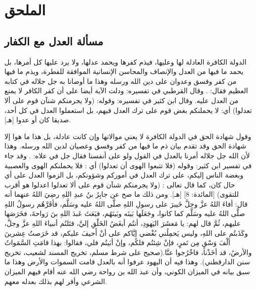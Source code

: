 \chapter{الملحق}
\label{sec:appendix}

\section{مسألة العدل مع الكفار}
\label{sec:app_justice}

الدولة الكافرة العادلة لها وعليها، فيذم كفرها ويحمد عدلها، ولا يرد عليها كل أمرها، بل يحمد ما فيها من العدل والإنصاف والمحاسن الإنسانية الموافقة للفطرة، ويذم ما فيها من كفر وفسق وعدوان على دين الله ورسله وهذا ما أوصانا به جل جلاله في كتابه العظيم فقال: 
\quranayah*[5][8]{\footnotesize \surahname*[5]}. وقال القرطبي في تفسيره: ودلت الآية أيضا على أن كفر الكافر لا يمنع من العدل عليه. وقال ابن كثير في تفسيره: وقوله: (ولا يجرمنكم شنآن قوم على ألا تعدلوا) أي: لا يحملنكم بغض قوم على ترك العدل فيهم، بل استعملوا العدل في كل أحد، صديقا كان أو عدوا [هـ]. 


وقول شهادة الحق في الدولة الكافرة لا يعني موالاتها وإن كانت عادلة، بل هذا ما هوا إلا شهادة الحق وقد تقدم بيان ذم ما فيها من كفر وفسق وعصيان لدين الله ورسله. وهذا لأن الله جل جلاله أمرنا بالعدل في القول ولو على أنفسنا فقال جل في علاه:
\quranayah*[4][135]{\footnotesize \surahname*[4]}. وقد جاء في تفسير ابن كثير: وقوله (فلا تتبعوا الهوى أن تعدلوا) أي : فلا يحملنكم الهوى والعصبية وبغضة الناس إليكم، على ترك العدل في أموركم وشؤونكم، بل الزموا العدل على أي حال كان، كما قال تعالى : (ولا يجرمنكم شنآن قوم على ألا تعدلوا اعدلوا هو أقرب للتقوى) [المائدة: 8] [هـ]. ومن ذلك ما صح عن جابِرُ بنُ عبدِ اللهِ رضِيَ اللهُ عنهما أنه قال: أفاءَ اللهُ عزَّ وجلَّ خَيبرَ على رسولِ اللهِ صلَّى اللهُ عليه وسَلَّم، فأقَرَّهُم رسولُ اللهِ صلَّى اللهُ عليه وسَلَّم كما كانوا، وجَعَلَها بَينَه وبَينَهُم، فبَعَثَ عَبدَ اللهِ بنَ رَواحةَ، فخَرَصَها عليهم، ثُمَّ قال لهم: يا مَعشَرَ اليَهودِ، أنتُم أبغَضُ الخَلْقِ إليَّ، قتَلتُم أنبياءَ اللهِ عزَّ وجلَّ، وكَذَبتُم على اللهِ، وليس يَحمِلُني بُغْضي إيَّاكم على أنْ أَحيفَ عليكم، قد خَرَصتُ عِشرينَ ألْفَ وَسْقٍ مِن تَمرٍ، فإنْ شِئتُم فلكُم، وإنْ أبَيتُم فلي، فقالوا: بهذا قامَتِ السَّمَواتُ والأرضُ، قد أخَذْنا، فاخْرُجوا عنَّا.{\footnotesize (صحيح على شرط مسلم، تخريج المسند لشعيب، تخريج سنن الدارقطني)}. وهذا فيه أن اليهود عرفوا أنه بالعدل قامت السموات والأرض وهذا ما سبق بيانه في الميزان الكوني، وأن عبد الله بن رواحة رضي الله عنه أقام فيهم الميزان الشرعي وأقر لهم بذلك بعدله معهم. 

